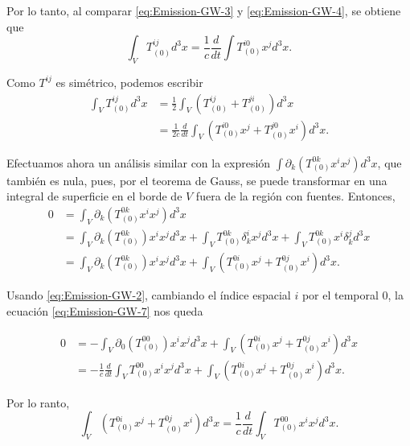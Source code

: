 \documentclass[letterpaper,11pt]{article}
\begin{document}
Por lo tanto, al comparar \eqref{eq:Emission-GW-3} y \eqref{eq:Emission-GW-4}, se obtiene que
\begin{equation}
\int_{V} T_{(0)}^{ij} d^3 x = \frac{1}{c} \frac{d}{dt} \int T_{(0)}^{i0} x^{j} d^3x.\label{eq:Emission-GW-5}
\end{equation}

Como $T^{ij}$ es simétrico, podemos escribir
\begin{align}
\int_{V} T_{(0)}^{ij} d^3 x &= \frac{1}{2} \int_{V} \left( T_{(0)}^{ij}  + T_{(0)}^{ji}\right) d^3 x \nonumber \\
&= \frac{1}{2c} \frac{d}{dt} \int_{V} \left( T_{(0)}^{i0} x^{j} + T_{(0)}^{j0} x^{i}\right) d^3x. \label{eq:Emission-GW-6}
\end{align}

Efectuamos ahora un análisis similar con la expresión $\int \partial_{k} (T_{(0)}^{0k} x^{i} x^{j}) d^3x $, que también es nula, pues, por el teorema de Gauss, se puede transformar en una integral de superficie en el borde de $V$ fuera de la región con fuentes. Entonces,
\begin{align}
0 &= \int_{V} \partial_{k} (T_{(0)}^{0k} x^{i} x^{j}) d^3x \nonumber \\
&= \int_{V} \partial_{k} (T_{(0)}^{0k}) x^{i} x^{j} d^3x + \int_{V}  T_{(0)}^{0k} \delta^{i}_{k} x^{j} d^3x + \int_{V}  T_{(0)}^{0k} x^{i}\delta^{j}_{k}  d^3x \nonumber \\
&= \int_{V} \partial_{k} (T_{(0)}^{0k}) x^{i} x^{j} d^3x + \int_{V} \left(T_{(0)}^{0i} x^{j} + T_{(0)}^{0j} x^{i} \right) d^3x.\label{eq:Emission-GW-7}
\end{align}

Usando \eqref{eq:Emission-GW-2}, cambiando el índice espacial $i$ por el temporal $0$,  la ecuación \eqref{eq:Emission-GW-7} nos queda

\begin{align}
0 &= - \int_{V} \partial_{0} (T_{(0)}^{00}) x^{i} x^{j} d^3x + \int_{V} \left(T_{(0)}^{0i} x^{j} + T_{(0)}^{0j} x^{i} \right) d^3x \nonumber \\
&= - \frac{1}{c} \frac{d}{dt} \int_{V} T_{(0)}^{00}x^{i}x^{j} d^3 x + \int_{V} \left(T_{(0)}^{0i} x^{j} + T_{(0)}^{0j} x^{i} \right) d^3x.
\end{align}

Por lo ranto,
\begin{equation}
\int_{V} \left(T_{(0)}^{0i} x^{j} + T_{(0)}^{0j} x^{i} \right) d^3x = \frac{1}{c} \frac{d}{dt} \int_{V} T_{(0)}^{00}x^{i}x^{j} d^3 x.\label{eq:Emission-GW-8}
\end{equation}
\end{document}
